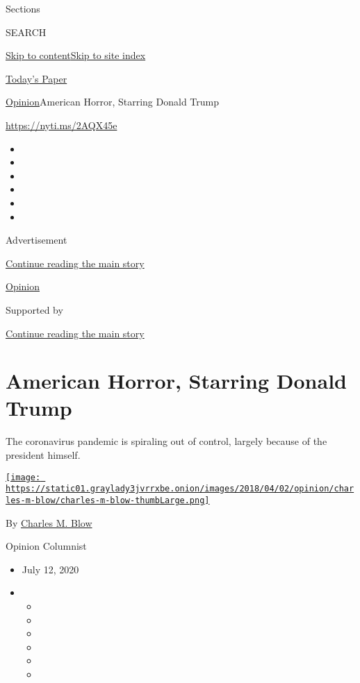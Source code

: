 Sections

SEARCH

\protect\hyperlink{site-content}{Skip to
content}\protect\hyperlink{site-index}{Skip to site index}

\href{https://myaccount.nytimes3xbfgragh.onion/auth/login?response_type=cookie\&client_id=vi}{}

\href{https://www.nytimes3xbfgragh.onion/section/todayspaper}{Today's
Paper}

\href{/section/opinion}{Opinion}\textbar{}American Horror, Starring
Donald Trump

\url{https://nyti.ms/2AQX45e}

\begin{itemize}
\item
\item
\item
\item
\item
\item
\end{itemize}

Advertisement

\protect\hyperlink{after-top}{Continue reading the main story}

\href{/section/opinion}{Opinion}

Supported by

\protect\hyperlink{after-sponsor}{Continue reading the main story}

\hypertarget{american-horror-starring-donald-trump}{%
\section{American Horror, Starring Donald
Trump}\label{american-horror-starring-donald-trump}}

The coronavirus pandemic is spiraling out of control, largely because of
the president himself.

\href{https://www.nytimes3xbfgragh.onion/by/charles-m-blow}{\texttt{[image: https://static01.graylady3jvrrxbe.onion/images/2018/04/02/opinion/charles-m-blow/charles-m-blow-thumbLarge.png]}}

By \href{https://www.nytimes3xbfgragh.onion/by/charles-m-blow}{Charles
M. Blow}

Opinion Columnist

\begin{itemize}
\item
  July 12, 2020
\item
  \begin{itemize}
  \item
  \item
  \item
  \item
  \item
  \item
  \end{itemize}
\end{itemize}

